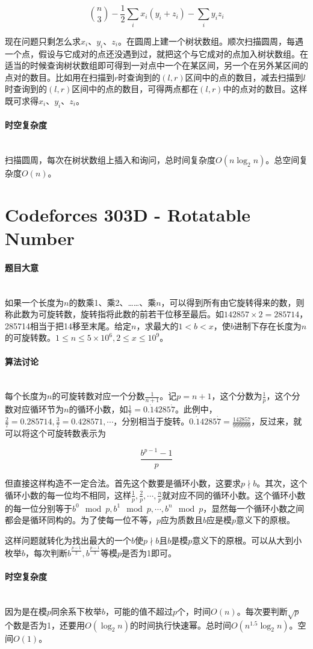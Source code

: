 \documentclass[UTF8]{ctexart}
\newcommand{\myparagraph}[1]{\paragraph{#1}\mbox{}\\}
\theoremstyle{nonumberplain}
\begin{document}
			$$ \binom{n}{3}-\frac{1}{2}\sum_i x_i(y_i+z_i)-\sum_i y_i z_i $$
			
			现在问题只剩怎么求$x_i$、$y_i$、$z_i$。在圆周上建一个树状数组。顺次扫描圆周，每遇一个点，假设与它成对的点还没遇到过，就把这个与它成对的点加入树状数组。在适当的时候查询树状数组即可得到一对点中一个在某区间，另一个在另外某区间的点对的数目。比如用在扫描到$r$时查询到的$(l,r)$区间中的点的数目，减去扫描到$l$时查询到的$(l,r)$区间中的点的数目，可得两点都在$(l,r)$中的点对的数目。这样既可求得$x_i$、$y_i$、$z_i$。
		
		\myparagraph{时空复杂度}
		
			扫描圆周，每次在树状数组上插入和询问，总时间复杂度$O(n\log_2n)$。总空间复杂度$O(n)$。
	
	\section{Codeforces 303D - Rotatable Number}
	
		\myparagraph{题目大意}
		
			如果一个长度为$n$的数乘1、乘2、……、乘$n$，可以得到所有由它旋转得来的数，则称此数为可旋转数，旋转指将此数的前若干位移至最后。如$142857 \times 2=285714$，285714相当于把14移至末尾。给定$n$，求最大的$1<b<x$，使$b$进制下存在长度为$n$的可旋转数。$1 \leq n \leq 5 \times 10^6, 2 \leq x \leq 10^9$。
		
		\myparagraph{算法讨论}
		
			每个长度为$n$的可旋转数对应一个分数$\frac{1}{n+1}$。记$p=n+1$，这个分数为$\frac{1}{p}$，这个分数对应循环节为$n$的循环小数，如$\frac{1}{7}=0.\dot{1}4285\dot{7}$。此例中，$\frac{2}{7}=0.285714, \frac{3}{7}=0.428571, \cdots$，分别相当于旋转。$0.\dot{1}4285\dot{7}=\frac{142857}{999999}$，反过来，就可以将这个可旋转数表示为
			
			$$\frac{b^{p-1}-1}{p}$$
			
			但直接这样构造不一定合法。首先这个数要是循环小数，这要求$p \nmid b$。其次，这个循环小数的每一位均不相同，这样$\frac{1}{p}, \frac{2}{p}, \cdots, \frac{n}{p}$就对应不同的循环小数。这个循环小数的每一位分别等于$b^0 \mod p, b^1 \mod p, \cdots, b^n \mod p$，显然每一个循环小数之间都会是循环同构的。为了使每一位不等，$p$应为质数且$b$应是模$p$意义下的原根。
			
			这样问题就转化为找出最大的一个$b$使$p \nmid b$且$b$是模$p$意义下的原根。可以从大到小枚举$b$，每次判断$b^{\frac{p-1}{2}}, b^{\frac{p-1}{3}}$等模$p$是否为1即可。
		
		\myparagraph{时空复杂度}
		
			因为是在模$p$同余系下枚举$b$，可能的值不超过$p$个，时间$O(n)$。每次要判断$\sqrt{p}$个数是否为1，还要用$O(\log_2n)$的时间执行快速幂。总时间$O(n^{1.5} \log_2n)$。空间$O(1)$。
	
\end{document}
